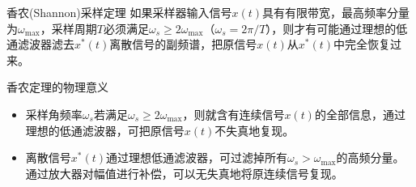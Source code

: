 \documentclass[handout,cjkutf8,table,aspectratio=1610]{beamer} %
\begin{document}
\begin{frame}{香农(Shannon)采样定理}
	如果采样器输入信号$x(t)$具有有限带宽，最高频率分量为$\omega_{\max}$，采样周期$T$必须满足\alert{$\omega_s\ge2\omega_{\max}$}（$\omega_s=2\pi/T$），则才有可能通过理想的低通滤波器滤去$x^*(t)$离散信号的副频谱，把原信号$x(t)$从$x^*(t)$中完全恢复过来。
	\begin{block}{香农定理的物理意义}
		\begin{itemize}
			\item 采样角频率$\omega_s$若满足$\omega_s\ge 2\omega_{\max}$，则就含有连续信号$x(t)$的全部信息，通过理想的低通滤波器，可把原信号$x(t)$不失真地复现。
			\item 离散信号$x^*(t)$通过理想低通滤波器，可过滤掉所有$\omega_s>\omega_{\max}$的高频分量。通过放大器对幅值进行补偿，可以无失真地将原连续信号复现。
		\end{itemize}
	\end{block}
\end{frame}
\end{document}
